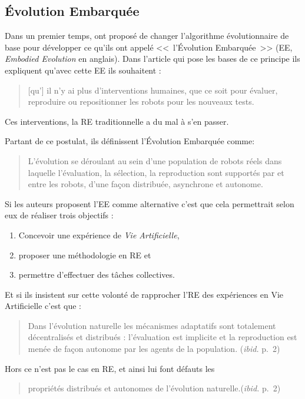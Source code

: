\subsection{\'Evolution Embarquée}
Dans un premier temps, \cite{watson02embodiedevolutiondistributingevolutionaryalgorithmpopulationrobots} ont proposé de changer l'algorithme évolutionnaire de base pour développer ce qu'ils ont appelé <<~l'\'Evolution Embarquée~>> (EE, \emph{Embodied Evolution} en anglais). Dans l'article qui pose les bases de ce principe ils expliquent qu'avec cette EE ils souhaitent :
\begin{quote}
   [qu'] il n'y ai plus d'interventions humaines, que ce soit pour évaluer, reproduire ou repositionner les robots pour les nouveaux tests.\\
   \citep[p.~1]{watson02embodiedevolutiondistributingevolutionaryalgorithmpopulationrobots}
\end{quote}
Ces interventions, la RE traditionnelle a du mal à s'en passer.

Partant de ce postulat, ils définissent l'\'Evolution Embarquée comme:
\begin{quotation}
   L'évolution se déroulant au sein d'une population de robots réels dans laquelle l'évaluation, la sélection, la reproduction sont supportés par et entre les robots, d'une façon distribuée, asynchrone et autonome.\\
   \citep[p.~2]{watson02embodiedevolutiondistributingevolutionaryalgorithmpopulationrobots}
\end{quotation}

Si les auteurs proposent l'EE comme alternative c'est que cela permettrait selon eux de réaliser trois objectifs :
\begin{enumerate}
\item Concevoir une expérience de \emph{Vie Artificielle},
\item proposer une méthodologie en RE et
\item permettre d'effectuer des tâches collectives.
\end{enumerate}

Et si ils insistent sur cette volonté de rapprocher l'RE des expériences en Vie Artificielle c'est que :
\begin{quote}
   Dans l'évolution naturelle les mécanismes adaptatifs sont totalement décentralisés et distribués : l'évaluation est implicite et la reproduction est menée de façon autonome par les agents de la population. (\emph{ibid.} p.~2)
\end{quote}
Hors ce n'est pas le cas en RE, et ainsi lui font défauts les
\begin{quote}
   propriétés distribués et autonomes de l'évolution naturelle.(\emph{ibid.} p.~2)
\end{quote}

